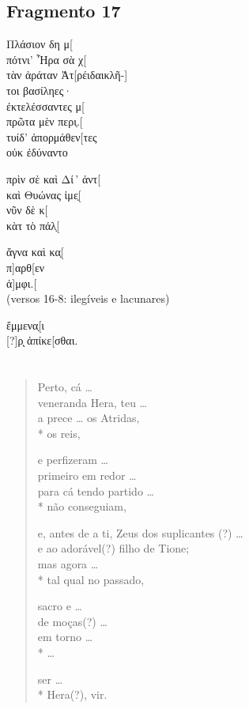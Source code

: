 \section{Fragmento 17}

\begin{gkverse}
Πλάσιον δη μ[\\
πότνι’ Ἦρα σὰ χ[\\
τὰν ἀράταν Ἀτ[ρέιδαι\qquad        κλῆ-]\\
τοι βασίληες·\\

ἐκτελέσσαντες μ[\\
πρῶτα μὲν περι̣.[\\
τυίδ’ ἀπορμάθεν[τες\\
οὐκ ἐδύναντο

πρὶν σὲ καὶ Δί\,’ ἀντ[\\
καὶ Θυώνας ἰμε̣[\\
νῦν δὲ κ[\\
κὰτ τὸ πάλ̣[

ἄγνα καὶ κα̣[\\
π]αρθ[εν\\
ἀ]μφι.[\\
\textnormal{(versos 16-8: ilegíveis e lacunares)}

ἔμμενα̣[ι\\
{[}?{]}ρ̣ ̣ἀπίκε[σθαι.
\end{gkverse}

\chapter*{}
\section*{}

\begin{verse}
Perto, cá \ldots{}\\
veneranda Hera, teu \ldots{}\\
a prece \ldots{} os Atridas,\\*
os reis,

e perfizeram \ldots{}\\
primeiro em redor \ldots{}\\
para cá tendo partido \ldots{}\\*
não conseguiam,

e, antes de a ti, Zeus dos suplicantes (?) \ldots{}\\
e ao adorável(?) filho de Tione;\\
mas agora \ldots{}\\*
tal qual no passado,

sacro e \ldots{}\\
de moças(?) \ldots{}\\
em torno \ldots{}\\*
\ldots{}

ser \ldots{}\\*
Hera(?), vir.
\end{verse}


